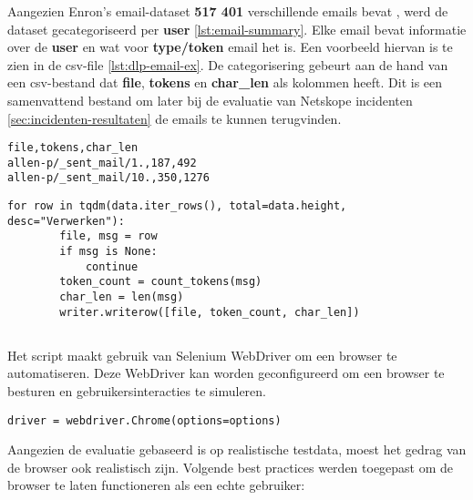 Aangezien Enron's email-dataset \textbf{517 401} verschillende emails bevat \autocite{Cukierski2015Enron}, werd de dataset gecategoriseerd per \textbf{user} \ref{lst:email-summary}. 
Elke email bevat informatie over de \textbf{user} en wat voor \textbf{type/token} email het is. Een voorbeeld hiervan is te zien in de \gls{csv}-file \ref{lst:dlp-email-ex}.
De categorisering gebeurt aan de hand van een \gls{csv}-bestand dat \textbf{file}, \textbf{tokens} en \textbf{char\_len} als kolommen heeft.
Dit is een samenvattend bestand om later bij de evaluatie van Netskope incidenten \ref{sec:incidenten-resultaten} de emails te kunnen terugvinden. 

\begin{lstlisting}[style=custompython, label={lst:dlp-csv}, caption={emails\_summary.csv \gls{csv}-bestand}, captionpos=b]
file,tokens,char_len
allen-p/_sent_mail/1.,187,492
allen-p/_sent_mail/10.,350,1276
\end{lstlisting}

\begin{lstlisting}[style=custompython, label={lst:dlp-categorisering}, caption={Categorisering van de dataset per gebruiker}, captionpos=b]
    for row in tqdm(data.iter_rows(), total=data.height, desc="Verwerken"):
        file, msg = row
        if msg is None:
            continue
        token_count = count_tokens(msg)
        char_len = len(msg)
        writer.writerow([file, token_count, char_len])
\end{lstlisting}


\subsection{}
\label{subsubsec:browserautomatisering}

Het script maakt gebruik van Selenium WebDriver om een browser te automatiseren.
Deze WebDriver kan worden geconfigureerd om een browser te besturen en gebruikersinteracties te simuleren.

\begin{lstlisting}[style=custompython, label={lst:dlp-chrome}, caption={Selenium-script voor browserautomatisering}, captionpos=b]
    driver = webdriver.Chrome(options=options)
\end{lstlisting}

Aangezien de evaluatie gebaseerd is op realistische testdata, moest het gedrag van de browser ook realistisch zijn.
Volgende \textcite{Selenium2025WebDriver} best practices werden toegepast om de browser te laten functioneren als een echte gebruiker:

